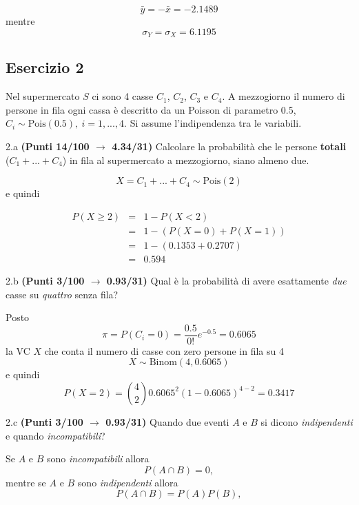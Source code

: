 \documentclass[
  11pt,
]{book}
\theoremstyle{mytheoremstyle}
\theoremstyle{mydefstyle}
\newenvironment{sol}
  {
  \begin{tcolorbox}[enhanced,breakable,arc=0.1mm,boxrule=1pt,colback=white,colframe=iblue,
  title=\bf \fontfamily{lmss}\selectfont \hspace{.5 cm} Soluzione,drop fuzzy shadow]

}{
\end{tcolorbox}
  }
\begin{document}
\begin{sol}
\[
\bar y=-\bar x=-2.1489
\]
mentre
\[
\sigma_Y=\sigma_X=6.1195
\]

\end{sol}

\subsection{Esercizio 2}\label{esercizio-2-3}

Nel supermercato \(S\) ci sono 4 casse \(C_1\), \(C_2\), \(C_3\) e \(C_4\). A mezzogiorno il numero di persone in fila ogni cassa è descritto da un Poisson di parametro 0.5, \(C_i\sim\text{Pois}(0.5),~i=1,...,4\). Si assume l'indipendenza tra le variabili.

2.a \textbf{(Punti 14/100 \(\rightarrow\) 4.34/31)} Calcolare la probabilità che le persone \textbf{totali} (\(C_1+...+C_4\)) in fila al supermercato a mezzogiorno, siano almeno due.

\begin{sol}
\[
X=C_1+...+C_4\sim \text{Pois}(2)
\]
e quindi

\begin{eqnarray*}
P(X\ge 2)&=&1-P(X< 2)\\
&=&1-(P(X=0)+P(X=1))\\
&=&1-(0.1353+0.2707)\\
&=&0.594
\end{eqnarray*}

\end{sol}

2.b \textbf{(Punti 3/100 \(\rightarrow\) 0.93/31)} Qual è la probabilità di avere esattamente \emph{due} casse su \emph{quattro} senza fila?

\begin{sol}
Posto
\[
\pi = P(C_i=0)=\frac {0.5}{0!}e^{-0.5}=0.6065
\]
la VC \(X\) che conta il numero di casse con zero persone in fila su 4
\[
X\sim\text{Binom}(4,0.6065)
\]
e quindi
\[
P(X=2)=\binom{4}{2}0.6065^2(1-0.6065)^{4-2}=0.3417
\]

\end{sol}

2.c \textbf{(Punti 3/100 \(\rightarrow\) 0.93/31)} Quando due eventi \(A\) e \(B\) si dicono \emph{indipendenti} e quando \emph{incompatibili}?

\begin{sol}
Se \(A\) e \(B\) sono \emph{incompatibili} allora
\[
P(A\cap B)=0,
\]
mentre se \(A\) e \(B\) sono \emph{indipendenti} allora
\[
P(A\cap B)=P(A)P(B),
\]

\end{sol}
\end{document}
